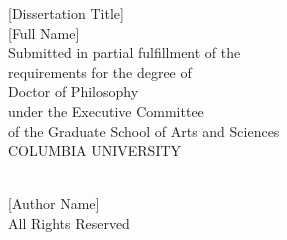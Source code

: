 \documentclass[12pt]{report}   %
\begin{document}
\doublespacing  %


\begin{titlepage}
\begin{center}

\begin{singlespacing}
\vspace*{6\baselineskip}
[Dissertation Title]\\
\vspace{3\baselineskip}
[Full Name]\\
\vspace{18\baselineskip}
Submitted in partial fulfillment of the\\
requirements for the degree of\\
Doctor of Philosophy\\
under the Executive Committee\\
of the Graduate School of Arts and Sciences\\
\vspace{3\baselineskip}
COLUMBIA UNIVERSITY\\
\vspace{3\baselineskip}
\the\year
\vfill


\end{singlespacing}

\end{center}
\end{titlepage}









\begin{titlepage}
\begin{singlespacing}
\begin{center}

\vspace*{35\baselineskip}

\textcopyright  \,  \the\year\\
\vspace{\baselineskip}	
[Author Name]\\
\vspace{\baselineskip}	
All Rights Reserved
\end{center}
\vfill

\end{singlespacing}
\end{titlepage}
\end{document}
